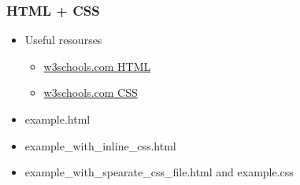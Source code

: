 \documentclass[t]{beamer}
\begin{document}
\begin{frame}[fragile]
    \frametitle{HTML + CSS}
    \begin{itemize}
        \item Useful resourses
            \begin{itemize}
                \item \href{https://www.w3schools.com/html/default.asp}{w3schools.com HTML}
                \item \href{https://www.w3schools.com/css/default.asp}{w3schools.com CSS}
            \end{itemize}
        \item example.html
        \item example_with_inline_css.html
        \item example_with_spearate_css_file.html and example.css
    \end{itemize}
\end{frame}





\end{document}
